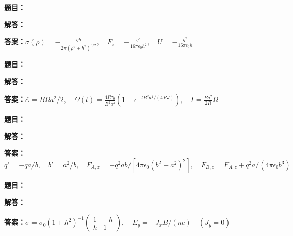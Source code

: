\documentclass[lang=cn,color=blue,11pt]{elegantbook}
\begin{document}
\par\smallskip\noindent\hrulefill\par\medskip
{}\par
\noindent\textbf{题目：}
\par\noindent\textbf{解答：}
\par\noindent\textbf{答案：}\(\displaystyle \sigma(\rho)=-\frac{qh}{2\pi(\rho^2+h^2)^{3/2}},\quad F_z=-\frac{q^2}{16\pi\epsilon_0h^2},\quad U=-\frac{q^2}{16\pi\epsilon_0h}\)\par
\par\smallskip\noindent\hrulefill\par\medskip
{}\par
\noindent\textbf{题目：}
\par\noindent\textbf{解答：}
\par\noindent\textbf{答案：}\(\displaystyle \mathcal E=B\Omega a^2/2,\quad \Omega(t)=\frac{4R\tau_0}{B^2a^4}(1-e^{-tB^2a^4/(4RJ)}),\quad I=\frac{Ba^2}{2R}\Omega\)\par
\par\smallskip\noindent\hrulefill\par\medskip
{}\par
\noindent\textbf{题目：}
\par\noindent\textbf{解答：}
\par\noindent\textbf{答案：}\(\displaystyle q'=-qa/b,\quad b'=a^2/b,\quad F_{A,z}=-q^2ab/[4\pi\epsilon_0(b^2-a^2)^2],\quad F_{B,z}=F_{A,z}+q^2a/(4\pi\epsilon_0b^3)\)\par
\par\smallskip\noindent\hrulefill\par\medskip
{}\par
\noindent\textbf{题目：}
\par\noindent\textbf{解答：}
\par\noindent\textbf{答案：}\(\displaystyle \sigma=\sigma_0(1+h^2)^{-1}\begin{pmatrix}1&-h\\h&1\end{pmatrix},\quad E_y=-J_xB/(ne)\quad(J_y=0)\)\par
\end{document}
